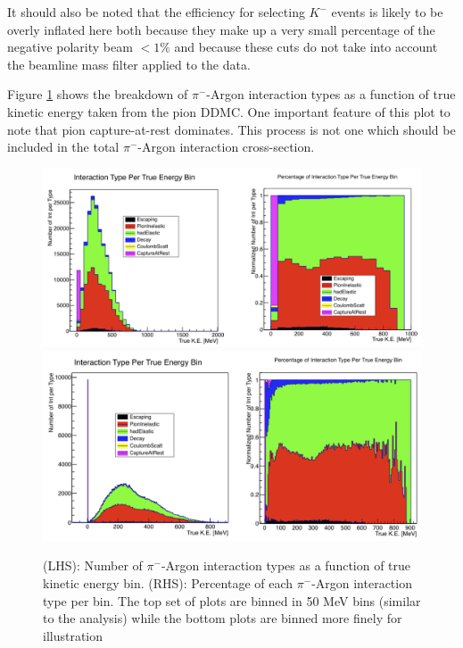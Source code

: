 It should also be noted that the efficiency for selecting $K^{-}$ events is likely to be overly inflated here both because they make up a very small percentage of the negative polarity beam $< 1\%$ and because these cuts do not take into account the beamline mass filter applied to the data.

Figure \ref{fig:TrueInteractionTypes} shows the breakdown of $\pi^{-}$-Argon interaction types as a function of true kinetic energy taken from the pion DDMC. One important feature of this plot to note that pion capture-at-rest dominates. This process is not one which should be included in the total $\pi^{-}$-Argon interaction cross-section.

\begin{figure}[h!]
\centering
\includegraphics[scale=0.33]{./images/PiArIntTypesTrue.png}
\includegraphics[scale=0.33]{./images/PiArIntTypesTrueFineBin.png}
\caption{(LHS): Number of $\pi^{-}$-Argon interaction types as a function of true kinetic energy bin. (RHS): Percentage of each $\pi^{-}$-Argon interaction type per bin. The top set of plots are binned in 50 MeV bins (similar to the analysis) while the bottom plots are binned more finely for illustration}
\label{fig:TrueInteractionTypes}
\end{figure}

